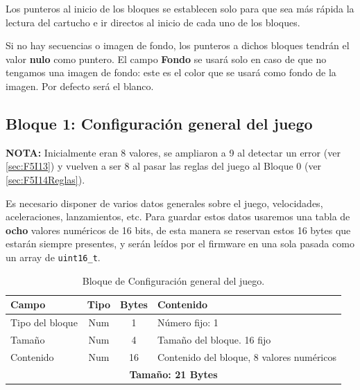 \addtocounter{footnote}{-1}


Los punteros al inicio de los bloques se establecen solo para que sea
más rápida la lectura del cartucho e ir directos al inicio de cada uno de los bloques.

Si no hay secuencias o imagen de fondo, los punteros a dichos bloques tendrán el valor \textbf{nulo} como puntero. El campo \textbf{Fondo} se usará solo en caso de que no tengamos una imagen de fondo: este es el color que se usará como fondo de la imagen. Por defecto será el blanco.


\subsection{Bloque 1: Configuración general del juego}
\label{sec:A02GWCBl1}

\textbf{NOTA:} Inicialmente eran 8 valores, se ampliaron a 9 al detectar un error (ver \ref{sec:F5I13}) y vuelven a ser 8 al pasar las reglas del juego al Bloque 0 (ver \ref{sec:F5I14Reglas}).

Es necesario disponer de varios datos generales sobre el juego, velocidades, aceleraciones, lanzamientos, etc. Para guardar estos datos usaremos una tabla de \textbf{ocho} valores numéricos de 16 bits, de esta manera se reservan estos 16 bytes que estarán siempre presentes, y serán leídos por el firmware en una sola pasada como un array de \texttt{uint16\_t}.

\begin{table}[htbp]
	\centering
	\begin{tabular}{|l|c|c|p{8.4cm}|}
		\hline
		\textbf{Campo} & \textbf{Tipo} & \textbf{Bytes} & \textbf{Contenido} \\
		\hline
		Tipo del bloque & Num & 1 & Número fijo: 1\\
		\hline
		
		Tamaño & Num & 4 & Tamaño del bloque. 16 fijo \\
		\hline
		
		Contenido & Num & 16 & Contenido del bloque, 8 valores numéricos \\
		
		\hline\hline
		\multicolumn{4}{c}{\textbf{Tamaño: 21 Bytes}} \\ \hline
	\end{tabular}
	\caption{Bloque de Configuración general del juego.}
\end{table}

